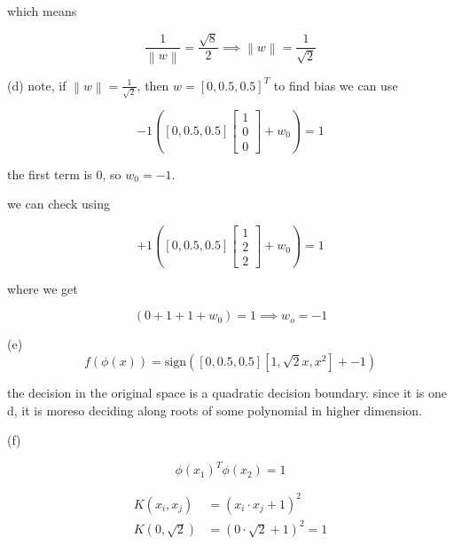 \documentclass{report}
\begin{document}
which means 

\begin{equation}
    \frac{1}{\left\|w\right\|} = \frac{\sqrt{8}}{2} \implies \left\|w\right\| = \frac{1}{\sqrt{2}}  
\end{equation}

(d)
note, if \(\left\|w\right\| = \frac{1}{\sqrt{2}}\), then \(w = [0,0.5,0.5]^T\)
to find bias we can use

\begin{equation}
    -1 \left( [0, 0.5, 0.5] \begin{bmatrix} 1 \\ 0 \\ 0 \end{bmatrix} + w_0 \right) = 1
\end{equation}

the first term is 0, so \(w_0=-1\).

we can check using 

\begin{equation}
    +1 \left( [0, 0.5, 0.5] \begin{bmatrix} 1 \\ 2 \\ 2 \end{bmatrix} + w_0 \right) = 1
\end{equation}

where we get 

\begin{equation}
    (0+1+1+w_0) = 1 \implies w_o = -1
\end{equation}


(e)
\begin{equation}
    f(\phi(x)) = \text{sign}([0,0.5,0.5] [1,\sqrt{2}x,x^2] + -1)
\end{equation}

the decision in the original space is a quadratic decision boundary. since it is one d, it is moreso deciding along roots of some polynomial in higher dimension.

(f)

\begin{equation}
    \phi(x_1)^T \phi(x_2) = 1
\end{equation}

\begin{equation}
    \begin{split}
        K(x_i, x_j) &= (x_i \cdot x_j + 1)^2\\
        K(0, \sqrt{2}) &= (0 \cdot \sqrt{2} + 1)^2 = 1
    \end{split}
\end{equation}
\end{document}

